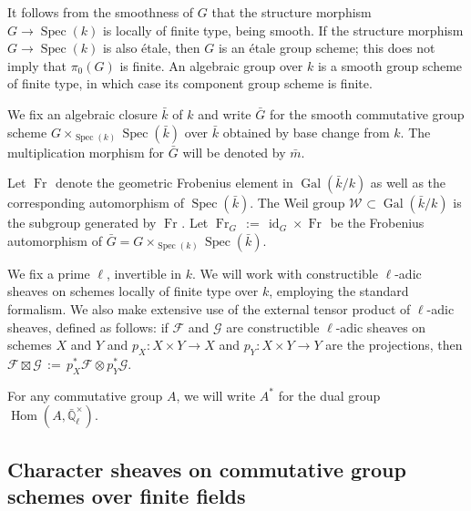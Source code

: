\documentclass[10pt]{amsart}
\theoremstyle{plain}
\theoremstyle{definition}
\newcommand{\EE}{\mathbb{\bar Q}_\ell}
\newcommand{\bFq}{\bar{k}}
\newcommand{\Fq}{k}
\newcommand{\EEx}{\EE^\times}
\newcommand{\Weil}[1]{\mathcal{W}_{#1}}
\DeclareMathOperator{\Gal}{Gal}
\newcommand{\Frob}[1]{\operatorname{Fr}_{#1}}
\DeclareMathOperator{\Hom}{Hom}
\DeclareMathOperator{\id}{id}
\newcommand{\Spec}[1]{{\operatorname{Spec}(#1)}}
\newcommand{\ceq}{{\, :=\, }}
\newcommand{\bm}{\bar{m}}
\newcommand{\bG}{\bar{G}}
\begin{document}
It follows from the smoothness of $G$ that the structure morphism $G \to \Spec{\Fq}$ is locally of finite type, being smooth.
If the structure morphism $G \to \Spec{\Fq}$ is also \'etale, then $G$ is an \'etale group scheme; this does not imply that $\pi_0(G)$ is finite.
An algebraic group over $\Fq$ is a smooth group scheme of finite type, in which case its component group scheme is finite.

We fix an algebraic closure $\bFq$ of $\Fq$ and write $\bG$ for the
smooth commutative group scheme $G \times_{\Spec{\Fq}} \Spec{\bFq}$ over $\bFq$
obtained by base change from $k$. The multiplication morphism for $\bG$ will be denoted by $\bm$.

Let $\Frob{}$ denote the geometric Frobenius element in $\Gal(\bFq/\Fq)$ as
well as the corresponding automorphism of $\Spec{\bFq}$. The Weil group
$\Weil{}\subset \Gal(\bFq/\Fq)$ is the subgroup generated by $\Frob{}$.
Let $\Frob{G} \ceq \id_{G} \times \Frob{}$ be the Frobenius automorphism of $\bG = G \times_{\Spec{\Fq}} \Spec{\bFq}$.

We fix a prime $\ell$, invertible in $\Fq$.
We will work with constructible $\ell$-adic sheaves 
on schemes locally of finite type over $\Fq$, employing the standard formalism.
We also make extensive use of the external tensor product of $\ell$-adic sheaves,
defined as follows: if $\mathcal{F}$ and $\mathcal{G}$ are constructible $\ell$-adic
sheaves on schemes $X$ and $Y$ and $p_X : X\times Y\to X$ and $p_Y : X\times Y \to Y$
are the projections, then $\mathcal{F}\boxtimes \mathcal{G} \ceq p_X^* \mathcal{F} \otimes p_Y^*\mathcal{G}$.

For any commutative group $A$, we will write $A^*$ for the dual group $\Hom(A, \EEx)$.

\subsection{Character sheaves on commutative group schemes over finite fields}\label{ssec:category}
\end{document}
